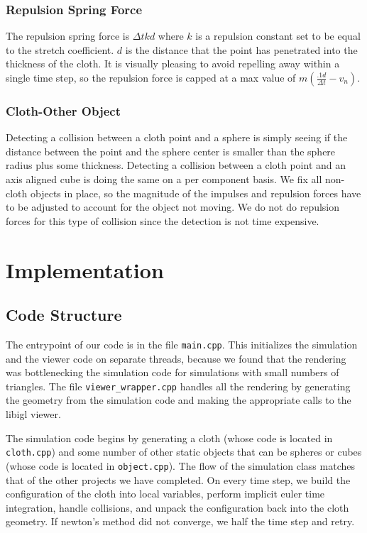 \documentclass{article}
\def\code#1{\texttt{#1}}
\begin{document}
        \subsubsection{Repulsion Spring Force}
        The repulsion spring force is $\Delta tkd$ where $k$ is a repulsion constant set to be equal to the stretch coefficient. $d$ is the distance that the point has penetrated into the thickness of the cloth. It is visually pleasing to avoid repelling away within a single time step, so the repulsion force is capped at a max value of $m(\frac{.1d}{\Delta t} - v_n)$.
        \subsubsection{Cloth-Other Object}
        Detecting a collision between a cloth point and a sphere is simply seeing if the distance between the point and the sphere center is smaller than the sphere radius plus some thickness. Detecting a collision between a cloth point and an axis aligned cube is doing the same on a per component basis. We fix all non-cloth objects in place, so the magnitude of the impulses and repulsion forces have to be adjusted to account for the object not moving. We do not do repulsion forces for this type of collision since the detection is not time expensive.
\section{Implementation}
    \subsection{Code Structure}
    The entrypoint of our code is in the file \code{main.cpp}. This initializes the simulation and the viewer code on separate threads, because we found that the rendering was bottlenecking the simulation code for simulations with small numbers of triangles. The file \code{viewer\_wrapper.cpp} handles all the rendering by generating the geometry from the simulation code and making the appropriate calls to the libigl viewer.

    The simulation code begins by generating a cloth (whose code is located in \code{cloth.cpp}) and some number of other static objects that can be spheres or cubes (whose code is located in \code{object.cpp}). The flow of the simulation class matches that of the other projects we have completed. On every time step, we build the configuration of the cloth into local variables, perform implicit euler time integration, handle collisions, and unpack the configuration back into the cloth geometry. If newton's method did not converge, we half the time step and retry.
\end{document}
